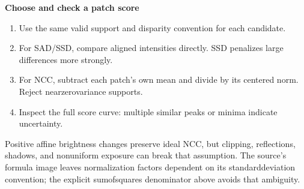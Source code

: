 \documentclass[letterpaper,11pt,english,openany,oneside]{jupyterBook}
\begin{document}
\begin{TextbookBox}
\textbf{Choose and check a patch score}\par\smallskip
\begin{enumerate}
%
\item {}
\sphinxAtStartPar
Use the same valid support and disparity convention for each candidate.

\item {}
\sphinxAtStartPar
For SAD/SSD, compare aligned intensities directly. SSD penalizes large differences more strongly.

\item {}
\sphinxAtStartPar
For NCC, subtract each patch’s own mean and divide by its centered norm. Reject near\sphinxhyphen{}zero\sphinxhyphen{}variance supports.

\item {}
\sphinxAtStartPar
Inspect the full score curve: multiple similar peaks or minima indicate uncertainty.

\end{enumerate}

\sphinxAtStartPar
Positive affine brightness changes preserve ideal NCC, but clipping, reflections, shadows, and nonuniform exposure can break that assumption. The source’s formula image leaves normalization factors dependent on its standard\sphinxhyphen{}deviation convention; the explicit sum\sphinxhyphen{}of\sphinxhyphen{}squares denominator above avoids that ambiguity.

\end{TextbookBox}
\label{\detokenize{lectures/lecture04/matching:ex-lec04-patches}}
\end{document}
